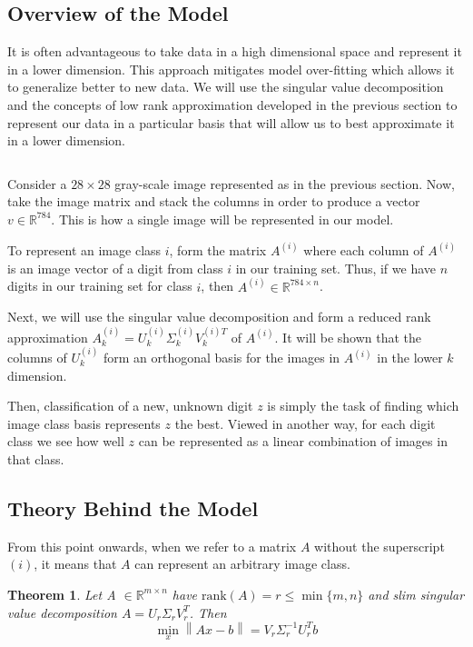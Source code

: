 \documentclass[a4paper]{article}
\newcommand{\vecnorm}[1]{\left\lVert#1\right\rVert}
\newtheorem{theorem}{Theorem}[section]
\begin{document}
\subsection{Overview of the Model}
It is often advantageous to take data in a high dimensional space and represent it in a lower dimension.  This approach mitigates  model over-fitting which allows it to generalize better to new data.  We will use the singular value decomposition and the concepts of low rank approximation developed in the previous section to represent our data in a particular basis that will allow us to best approximate it in a lower dimension.

$$
$$

Consider a $28\times 28$ gray-scale image represented as in the previous section.  Now, take the image matrix and stack the columns in order to produce a vector $v\in \mathbb{R}^{784}$.  This is how a single image will be represented in our model.

To represent an image class $i$, form the matrix $A^{(i)}$ where each column of $A^{(i)}$ is an image vector of a digit from class $i$ in our training set.  Thus, if we have $n$ digits in our training set for class $i$, then $A^{(i)} \in \mathbb{R}^{784\times n}$.

Next, we will use the singular value decomposition and form a reduced rank approximation $A^{(i)}_k = U^{(i)}_k\Sigma_k^{(i)}V^{(i)T}_k$ of $A^{(i)}$.  It will be shown that the columns of $U_k^{(i)}$ form an orthogonal basis for the images in $A^{(i)}$ in the lower $k$ dimension.

Then, classification of a new, unknown digit $z$ is simply the task of finding which image class basis represents $z$ the best.  Viewed in another way, for each digit class we see how well $z$ can be represented as a linear combination of images in that class.


\subsection{Theory Behind the Model}

From this point onwards, when we refer to a matrix $A$ without the superscript $(i)$, it means that $A$ can represent an arbitrary image class.


\begin{theorem}
Let A $\in \mathbb{R}^{m \times n}$ have $\text{rank} (A) = r \leq \min \{m,n\}$ and slim singular value decomposition $A=U_r\Sigma_rV_r^T$. Then
\begin{equation}
\min_x \vecnorm{Ax-b} = V_r\Sigma_r^{-1}U_r^Tb
\end{equation}
\end{theorem}
\end{document}
